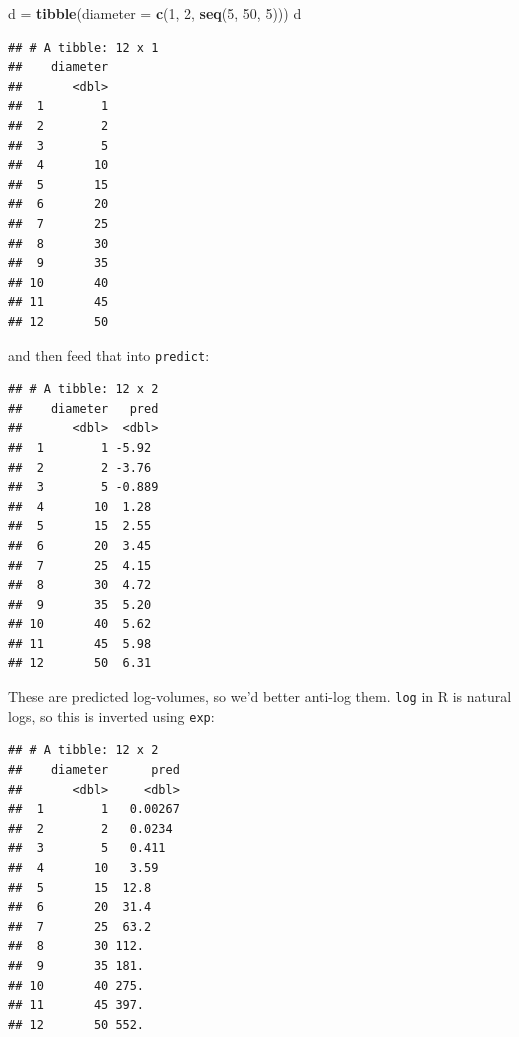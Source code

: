 \documentclass[]{tufte-book}
\newenvironment{Shaded}{}{}
\newcommand{\DataTypeTok}[1]{\textcolor[rgb]{0.56,0.13,0.00}{#1}}
\newcommand{\DecValTok}[1]{\textcolor[rgb]{0.25,0.63,0.44}{#1}}
\newcommand{\FloatTok}[1]{\textcolor[rgb]{0.25,0.63,0.44}{#1}}
\newcommand{\KeywordTok}[1]{\textcolor[rgb]{0.00,0.44,0.13}{\textbf{#1}}}
\newcommand{\NormalTok}[1]{#1}
\newcommand{\OperatorTok}[1]{\textcolor[rgb]{0.40,0.40,0.40}{#1}}
\newcommand{\StringTok}[1]{\textcolor[rgb]{0.25,0.44,0.63}{#1}}
\theoremstyle{definition}
\theoremstyle{definition}
\theoremstyle{definition}
\theoremstyle{remark}
\begin{document}
\begin{Shaded}
\begin{Highlighting}[]
\NormalTok{d =}\StringTok{ }\KeywordTok{tibble}\NormalTok{(}\DataTypeTok{diameter =} \KeywordTok{c}\NormalTok{(}\DecValTok{1}\NormalTok{, }\DecValTok{2}\NormalTok{, }\KeywordTok{seq}\NormalTok{(}\DecValTok{5}\NormalTok{, }\DecValTok{50}\NormalTok{, }\DecValTok{5}\NormalTok{)))}
\NormalTok{d}
\end{Highlighting}
\end{Shaded}

\begin{verbatim}
## # A tibble: 12 x 1
##    diameter
##       <dbl>
##  1        1
##  2        2
##  3        5
##  4       10
##  5       15
##  6       20
##  7       25
##  8       30
##  9       35
## 10       40
## 11       45
## 12       50
\end{verbatim}

and then feed that into \texttt{predict}:

\begin{Shaded}
\end{Shaded}

\begin{verbatim}
## # A tibble: 12 x 2
##    diameter   pred
##       <dbl>  <dbl>
##  1        1 -5.92 
##  2        2 -3.76 
##  3        5 -0.889
##  4       10  1.28 
##  5       15  2.55 
##  6       20  3.45 
##  7       25  4.15 
##  8       30  4.72 
##  9       35  5.20 
## 10       40  5.62 
## 11       45  5.98 
## 12       50  6.31
\end{verbatim}

These are predicted log-volumes, so we'd better anti-log them.
\texttt{log} in R is natural logs, so this is inverted using
\texttt{exp}:

\begin{Shaded}
\end{Shaded}

\begin{verbatim}
## # A tibble: 12 x 2
##    diameter      pred
##       <dbl>     <dbl>
##  1        1   0.00267
##  2        2   0.0234 
##  3        5   0.411  
##  4       10   3.59   
##  5       15  12.8    
##  6       20  31.4    
##  7       25  63.2    
##  8       30 112.     
##  9       35 181.     
## 10       40 275.     
## 11       45 397.     
## 12       50 552.
\end{verbatim}
\end{document}
